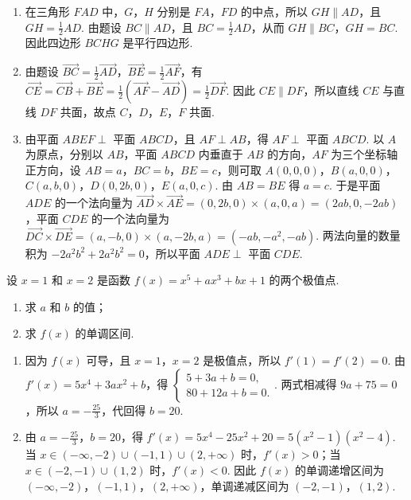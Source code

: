 \begin{solution}
\begin{enumerate}
\item 在三角形 \(FAD\) 中，\(G\)，\(H\) 分别是 \(FA\)，\(FD\) 的中点，所以 \(GH\parallel AD\)，且 \(GH=\frac12AD\). 由题设 \(BC\parallel AD\)，且 \(BC=\frac12AD\)，从而 \(GH\parallel BC\)，\(GH=BC\). 因此四边形 \(BCHG\) 是平行四边形.
\item 由题设 \(\overrightarrow{BC}=\frac12\overrightarrow{AD}\)，\(\overrightarrow{BE}=\frac12\overrightarrow{AF}\)，有 \(\overrightarrow{CE}=\overrightarrow{CB}+\overrightarrow{BE}=\frac12\left(\overrightarrow{AF}-\overrightarrow{AD}\right)=\frac12\overrightarrow{DF}\). 因此 \(CE\parallel DF\)，所以直线 \(CE\) 与直线 \(DF\) 共面，故点 \(C\)，\(D\)，\(E\)，\(F\) 共面.
\item 由平面 \(ABEF\perp\) 平面 \(ABCD\)，且 \(AF\perp AB\)，得 \(AF\perp\) 平面 \(ABCD\). 以 \(A\) 为原点，分别以 \(AB\)，平面 \(ABCD\) 内垂直于 \(AB\) 的方向，\(AF\) 为三个坐标轴正方向，设 \(AB=a\)，\(BC=b\)，\(BE=c\)，则可取 \(A(0,0,0)\)，\(B(a,0,0)\)，\(C(a,b,0)\)，\(D(0,2b,0)\)，\(E(a,0,c)\). 由 \(AB=BE\) 得 \(a=c\). 于是平面 \(ADE\) 的一个法向量为 \(\overrightarrow{AD}\times\overrightarrow{AE}=(0,2b,0)\times(a,0,a)=(2ab,0,-2ab)\)，平面 \(CDE\) 的一个法向量为 \(\overrightarrow{DC}\times\overrightarrow{DE}=(a,-b,0)\times(a,-2b,a)=(-ab,-a^{2},-ab)\). 两法向量的数量积为 \(-2a^{2}b^{2}+2a^{2}b^{2}=0\)，所以平面 \(ADE\perp\) 平面 \(CDE\).
\end{enumerate}
\end{solution}

\begin{problem}
设 \(x = 1\) 和 \(x = 2\) 是函数 \(f(x) = x^{5} + ax^{3} + bx + 1\) 的两个极值点.

\begin{enumerate}
\item 求 \(a\) 和 \(b\) 的值；
\item 求 \(f(x)\) 的单调区间.
\end{enumerate}
\end{problem}

\begin{solution}
\begin{enumerate}
\item 因为 \(f(x)\) 可导，且 \(x=1\)，\(x=2\) 是极值点，所以 \(f'(1)=f'(2)=0\). 由 \(f'(x)=5x^{4}+3ax^{2}+b\)，得
\(\begin{cases}
5+3a+b=0,\\
80+12a+b=0.
\end{cases}\).
两式相减得 \(9a+75=0\)，所以 \(a=-\frac{25}{3}\)，代回得 \(b=20\).
\item 由 \(a=-\frac{25}{3}\)，\(b=20\)，得 \(f'(x)=5x^{4}-25x^{2}+20=5(x^{2}-1)(x^{2}-4)\). 当 \(x\in(-\infty,-2)\cup(-1,1)\cup(2,+\infty)\) 时，\(f'(x)>0\)；当 \(x\in(-2,-1)\cup(1,2)\) 时，\(f'(x)<0\). 因此 \(f(x)\) 的单调递增区间为 \((-\infty,-2)\)，\((-1,1)\)，\((2,+\infty)\)，单调递减区间为 \((-2,-1)\)，\((1,2)\).
\end{enumerate}
\end{solution}

